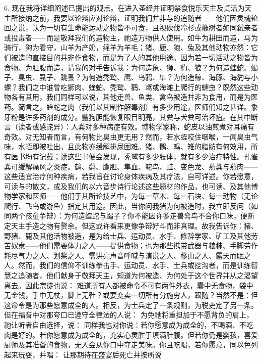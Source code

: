 6. 现在我将详细阐述已提出的观点。在进入圣经并证明禁食悦乐天主及贞洁为天主所接纳之前，我要以论辩应对论辩，证明我们并非与的追随者——他们因灵魂轮回之说，认为一切有生命能运动之物皆不可食，且视砍伐冷杉或橡树者如同弑亲者或投毒者——而是敬拜我们的造物主，祂造万物供人使用。如牛为耕田而造，马为骑行，狗为看守，山羊为产奶，绵羊为羊毛；猪、鹿、狍、兔及其他动物亦然：它们被造的直接目的并非作食物，而是为了人的其他用途。因为若一切活动之物皆为食物、为肚腹而造，请我的对手告诉我：为何造象、狮、豹、狼？为何造蝰蛇、蝎子、臭虫、虱子、跳蚤？为何造秃鹫、鹰、乌鸦、隼？为何造鲸、海豚、海豹与小螺？我们之中谁曾吃狮肉、蝰蛇、秃鹫、鹳、鸢或海滩上爬行的蠕虫？既然这些动物各有其用，我们同样可以说，其他走兽、鱼类、禽鸟被造并非为食用，而是为医药。简言之，蝰蛇之肉（我们以其制作解毒剂）有多少用途，医师们知之甚详。象牙粉是许多药剂的成分。鬣狗胆能恢复眼目明亮，其粪与犬粪可治坏疽。在其中断言（读者或感诧异）：人粪对多种病症有效。博物学家称，蛇皮以油煎煮对耳痛有奇效。对无知者而言，有何物比臭虫更无用？然而，若水蛭咬住咽喉，一闻臭虫气味，水蛭即被吐出，且此物亦缓解排尿困难。猪、鹅、鸡、雉的脂肪有何效用，所有医书均有记载；读这些书便会发现，秃鹫有多少肢体，就有多少治疗特性。孔雀粪可缓解痛风之炎症。鹤、鹳、鹰胆、隼血、鸵鸟、蛙、变色龙、燕粪与燕肉——这些适宜治疗何种疾病，若我旨在讨论身体疾病及其疗法，自可详述。你若愿意，可读与的散文，或及我们的以六音步诗行论述这些题材的作品，也可读、及其他博物学家和医师——他们于其所论技艺中，为每一草木、每一石块、每一动物（无论爬行、飞鸟或游鱼）指定其用途。因此，当你问我猪为何被造时，我立即反问（如同两个孩童争辩）：为何造蝰蛇与蝎子？你不能因许多走兽禽鸟不合你口味，便断定天主手造之物有赘余。但这或许看来更像争辩好斗而非真理。故我告诉你：猪、野猪、鹿及其他活物被造，是为给士兵、运动员、水手、修辞学家、矿工及其他劳苦奴隶——他们需要体力之人——提供食物；也为那些携带武器与粮秣、手脚劳作耗尽气力之人、划桨之人、需洪亮声音呼喊与演说之人、移山之人、露天而眠之人。然而，我们的信仰不训练拳击手、运动员、水手、士兵或挖沟者，而是训练智慧之追随者，他们献身于敬拜天主，知道为何被造、为何处于这个世界并从之渴望离去。因此宗徒也说：    难道所有人都被命令不可有两件外衣，囊中无食物，袋中无金钱，手中无杖，脚上无鞋？或要变卖一切所有分施穷人，跟随？当然不是：但这命令是为那些愿意成全的人。相反，为士兵定了一条规则，为税吏定了另一条。但在福音中对那夸口已遵守全律法的人说： 为免祂将重担加于不愿背负的肩上，祂让听者自由选择，说： 同样我也对你说：若你愿意成为成全的，不喝酒、不吃肉是好的。若你愿意成为成全的，充实心灵胜于填满肚腹。但若你仍是婴孩，喜爱厨师及其准备的食物，无人会从你口中夺走美味。你且吃喝，若你愿意，同以色列起来玩耍，并唱： 让那期待在盛宴后死亡并按所说  
